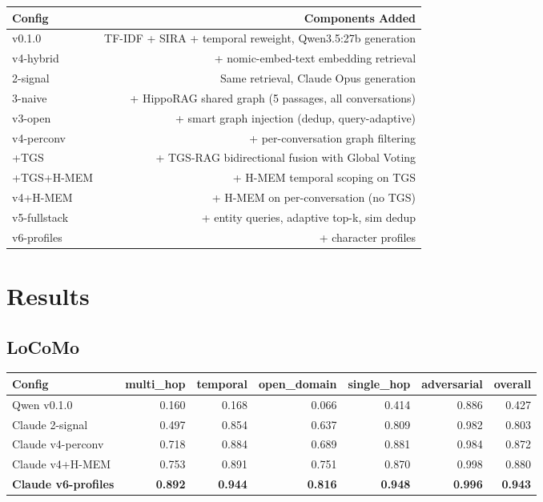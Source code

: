 \documentclass[11pt]{article}
\begin{document}
\begin{table}[htbp]
\centering
\small
\begin{tabular}{lr}
\toprule
\textbf{Config} & \textbf{Components Added} \\
\midrule
v0.1.0 & TF-IDF + SIRA + temporal reweight, Qwen3.5:27b generation \\
v4-hybrid & + nomic-embed-text embedding retrieval \\
2-signal & Same retrieval, Claude Opus generation \\
3-naive & + HippoRAG shared graph (5 passages, all conversations) \\
v3-open & + smart graph injection (dedup, query-adaptive) \\
v4-perconv & + per-conversation graph filtering \\
+TGS & + TGS-RAG bidirectional fusion with Global Voting \\
+TGS+H-MEM & + H-MEM temporal scoping on TGS \\
v4+H-MEM & + H-MEM on per-conversation (no TGS) \\
v5-fullstack & + entity queries, adaptive top-k, sim dedup \\
v6-profiles & + character profiles \\
\bottomrule
\end{tabular}
\end{table}



\section{Results}


\subsection{LoCoMo}


\begin{table}[htbp]
\centering
\small
\begin{tabular}{lrrrrrr}
\toprule
\textbf{Config} & \textbf{multi\_hop} & \textbf{temporal} & \textbf{open\_domain} & \textbf{single\_hop} & \textbf{adversarial} & \textbf{overall} \\
\midrule
Qwen v0.1.0 & 0.160 & 0.168 & 0.066 & 0.414 & 0.886 & 0.427 \\
Claude 2-signal & 0.497 & 0.854 & 0.637 & 0.809 & 0.982 & 0.803 \\
Claude v4-perconv & 0.718 & 0.884 & 0.689 & 0.881 & 0.984 & 0.872 \\
Claude v4+H-MEM & 0.753 & 0.891 & 0.751 & 0.870 & 0.998 & 0.880 \\
\textbf{Claude v6-profiles} & \textbf{0.892} & \textbf{0.944} & \textbf{0.816} & \textbf{0.948} & \textbf{0.996} & \textbf{0.943} \\
\bottomrule
\end{tabular}
\end{table}
\end{document}
